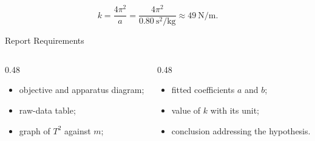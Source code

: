\begin{solutionframe}
  \[
    k=\frac{4\pi^2}{a}
     =\frac{4\pi^2}{\SI{0.80}{\second\squared\per\kilo\gram}}
     \approx\SI{49}{\newton\per\metre}.
  \]
  \vspace{0.5em}
\end{solutionframe}

\begin{frame}{Report Requirements}
  \begin{columns}[T,onlytextwidth]
    \begin{column}{0.48\textwidth}
      \begin{itemize}
        \item objective and apparatus diagram;
        \item raw-data table;
        \item graph of $T^2$ against $m$;
      \end{itemize}
    \end{column}
    \begin{column}{0.48\textwidth}
      \begin{itemize}
        \item fitted coefficients $a$ and $b$;
        \item value of $k$ with its unit;
        \item conclusion addressing the hypothesis.
      \end{itemize}
    \end{column}
  \end{columns}
\end{frame}


